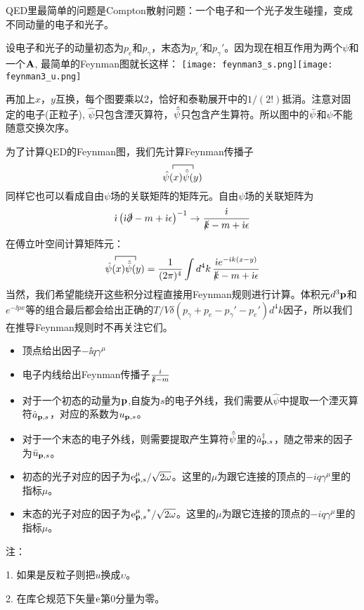 \documentclass[CJK]{beamer}
\begin{document}
\begin{frame}
\bch
{\small
QED里最简单的问题是Compton散射问题：一个电子和一个光子发生碰撞，变成不同动量的电子和光子。
\skipline

设电子和光子的动量初态为$p_e$和$p_\gamma$，末态为$p_e'$和$p_\gamma'$。因为现在相互作用为两个$\psi$和一个${\mathbf{A}}$, 最简单的Feynman图就长这样：
\texttt{[image: feynman3\_s.png]}\texttt{[image: feynman3\_u.png]}

再加上$x$，$y$互换，每个图要乘以2，恰好和泰勒展开中的$1/(2!)$抵消。注意对固定的电子(正粒子), $\hat\psi$只包含湮灭算符，$\hat{\bar{\psi}}$只包含产生算符。所以图中的$\bar{\psi}$和$\psi$不能随意交换次序。}
\ech
\end{frame}


\begin{frame}
\bch
为了计算QED的Feynman图，我们先计算Feynman传播子
$$\contr{\hat\psi(x)}{\hat{\barpsi}(y)}$$
同样它也可以看成自由$\psi$场的关联矩阵的矩阵元。自由$\psi$场的关联矩阵为
$$ {\dot{\imath}}\left({\dot{\imath}} \slashed{\partial}-m + {\dot{\imath}}\epsilon\right)^{-1} \rightarrow \frac{{\dot{\imath}}}{\slashed{k} - m + {\dot{\imath}}\epsilon}$$
在傅立叶空间计算矩阵元：
$$\contr{\hat\psi(x)}{\hat{\barpsi}(y)} = \frac{1}{(2\pi)^4}\int d^4k\, \frac{\ii e^{-\ii k(x-y)}}{\slashed{k} - m + \ii\epsilon} $$
当然，我们希望能绕开这些积分过程直接用Feynman规则进行计算。体积元$d^3{\mathbf{p}}$和$e^{-\ii px}$等的组合最后都会给出正确的$T/V\delta(p_\gamma+p_e - p_\gamma'-p_e')d^4k$因子，所以我们在推导Feynman规则时不再关注它们。
\ech
\end{frame}

\begin{frame}
\bch
{\small
\begin{itemize}
\item{顶点给出因子$-\ii q \gamma^\mu$}
\item{电子内线给出Feynman传播子$\frac{{\dot{\imath}}}{\slashed{k}-m}$}
\item{对于一个初态的动量为${\mathbf{p}}$,自旋为$s$的电子外线，我们需要从$\hat\psi$中提取一个湮灭算符${\hat{a}}_{{\mathbf{p}},s}$，对应的系数为$u_{{\mathbf{p}}, s}$。}
\item{对于一个末态的电子外线，则需要提取产生算符$\hat{\bar{\psi}}$里的${\hat{a}^\dagger}_{{\mathbf{p}},s}$，随之带来的因子为$\bar{u}_{{\mathbf{p}},s}$。}
\item{初态的光子对应的因子为$\mathrm{e}^\mu_{{\mathbf{p}},s}/\sqrt{2\omega}$。这里的$\mu$为跟它连接的顶点的$-iq\gamma^\mu$里的指标$\mu$。}
\item{末态的光子对应的因子为${\mathrm{e}^\mu_{{\mathbf{p}},s}}^*/\sqrt{2\omega}$。这里的$\mu$为跟它连接的顶点的$-iq\gamma^\mu$里的指标$\mu$。}
\end{itemize}

{\scriptsize
注：

1. 如果是反粒子则把$u$换成$\upsilon$。

2. 在库仑规范下矢量$\mathrm{e}$第0分量为零。} 

}

\ech
\end{frame}
\end{document}
